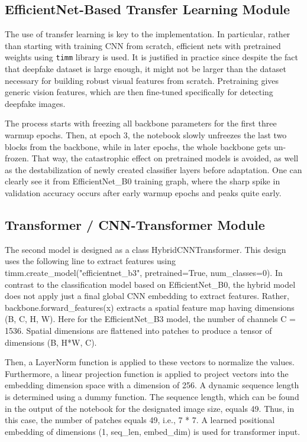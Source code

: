 \documentclass[12pt,a4paper]{report}
\begin{document}
\subsection{EfficientNet-Based Transfer Learning Module}

The use of transfer learning is key to the implementation. In particular, rather than starting with training CNN from scratch, efficient nets with pretrained weights using \texttt{timm} library is used. It is justified in practice since despite the fact that deepfake dataset is large enough, it might not be larger than the dataset necessary for building robust visual features from scratch. Pretraining gives generic vision features, which are then fine-tuned specifically for detecting deepfake images.

The process starts with freezing all backbone parameters for the first three warmup epochs. Then, at epoch 3, the notebook slowly unfreezes the last two blocks from the backbone, while in later epochs, the whole backbone gets un-frozen. That way, the catastrophic effect on pretrained models is avoided, as well as the destabilization of newly created classifier layers before adaptation. One can clearly see it from EfficientNet\_B0 training graph, where the sharp spike in validation accuracy occurs after early warmup epochs and peaks quite early.

\subsection{Transformer / CNN-Transformer Module}

The second model is designed as a class HybridCNNTransformer. This design uses the following line to extract features using timm.create\_model("efficientnet\_b3", pretrained=True, num\_classes=0). In contrast to the classification model based on EfficientNet\_B0, the hybrid model does not apply just a final global CNN embedding to extract features. Rather, backbone.forward\_features(x) extracts a spatial feature map having dimensions (B, C, H, W). Here for the EfficientNet\_B3 model, the number of channels C = 1536. Spatial dimensions are flattened into patches to produce a tensor of dimensions (B, H*W, C).

Then, a LayerNorm function is applied to these vectors to normalize the values. Furthermore, a linear projection function is applied to project vectors into the embedding dimension space with a dimension of 256. A dynamic sequence length is determined using a dummy function. The sequence length, which can be found in the output of the notebook for the designated image size, equals 49. Thus, in this case, the number of patches equals 49, i.e., 7 * 7. A learned positional embedding of dimensions (1, seq\_len, embed\_dim) is used for transformer input.
\end{document}
